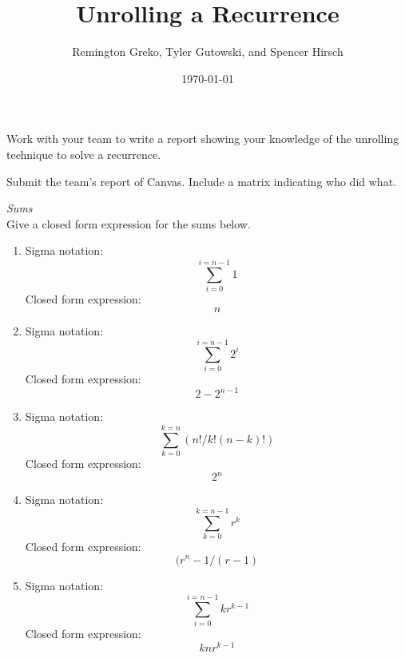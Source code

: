 \documentclass{article}
\begin{document}
\title{\textbf{Unrolling a Recurrence}}
\author{Remington Greko, Tyler Gutowski, and Spencer Hirsch}
\date{\today}

\maketitle

\noindent Work with your team to write a report showing your knowledge of
the unrolling technique to solve a recurrence.

\smallskip

\noindent Submit the team's report of Canvas. Include a matrix indicating
who did what.

\noindent \textit{Sums}\\
\noindent Give a closed form expression for the sums below.

\begin{enumerate}
    \item 
          Sigma notation:
          \begin{equation}
            \sum_{i=0}^{i=n-1}1
          \end{equation}
          Closed form expression:
	  \begin{equation}
	    n
	  \end{equation}
    \item
          Sigma notation:
          \begin{equation}
            \sum_{i=0}^{i=n-1}2^i
          \end{equation}
          Closed form expression:
	  \begin{equation}
	    2-2^{n-1}
	  \end{equation}
    \item
          Sigma notation:
          \begin{equation}
            \sum_{k=0}^{k=n}(n!/k!(n-k)!)
          \end{equation}
          Closed form expression:
	  \begin{equation}
	    2^{n}
	  \end{equation}
    \item
          Sigma notation:
          \begin{equation}
            \sum_{k=0}^{k=n-1}r^k
          \end{equation}
          Closed form expression:
	  \begin{equation}
	   (r^{n}-1/(r-1)
	  \end{equation}
    \item
          Sigma notation:
          \begin{equation}
            \sum_{i=0}^{i=n-1}kr^{k-1}
          \end{equation}
          Closed form expression:
	  \begin{equation}
	  knr^{k-1}
	  \end{equation}
\end{enumerate}
\end{document}
